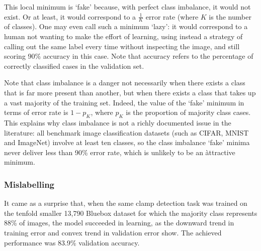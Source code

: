 \documentclass[a4paper,11pt]{article}
\begin{document}
This local minimum is `fake' because, with perfect class imbalance, it would not exist. Or at least, it would correspond to a $\frac{1}{K}$ error rate (where $K$ is the number of classes). One may even call such a minimum `lazy': it would correspond to a human not wanting to make the effort of learning, using instead a strategy of calling out the same label every time without inspecting the image, and still scoring 90\% accuracy in this case. Note that accuracy refers to the percentage of correctly classified cases in the validation set.

Note that class imbalance is a danger not necessarily when there exists a class that is far more present than another, but when there exists a class that takes up a vast majority of the training set. Indeed, the value of the `fake' minimum in terms of error rate is $1 - p_K$, where $p_K$ is the proportion of majority class cases. This explains why class imbalance is not a richly documented issue in the literature: all benchmark image classification datasets (such as CIFAR, MNIST and ImageNet) involve at least ten classes, so the class imbalance `fake' minima never deliver less than 90\% error rate, which is unlikely to be an àttractive minimum. 

\subsubsection{Mislabelling}

It came as a surprise that, when the same clamp detection task was trained on the tenfold smaller 13,790 Bluebox dataset for which the majority class represents 88\% of images, the model succeeded in learning, as the downward trend in training error and convex trend in validation error show. The achieved performance was 83.9\% validation accuracy.
\end{document}
